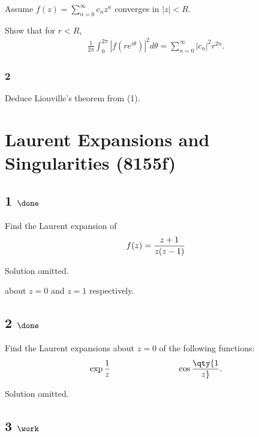 Assume \(\displaystyle f(z) = \sum_{n=0}^\infty c_n z^n\) converges in
\(|z| < R\).

Show that for \(r <R\),
\begin{align*}
\frac{1}{2 \pi} \int_0^{2 \pi} |f(r e^{i \theta})|^2 d \theta = \sum_{n=0}^\infty |c_n|^2 r^{2n}
.\end{align*}

\hypertarget{section-9}{%
\subsubsection{2}\label{section-9}}

Deduce Liouville's theorem from (1).

\hypertarget{laurent-expansions-and-singularities-8155f}{%
\section{Laurent Expansions and Singularities
(8155f)}\label{laurent-expansions-and-singularities-8155f}}

\hypertarget{done-6}{%
\subsection{\texorpdfstring{1
\(\done\)}{1 \textbackslash done}}\label{done-6}}

Find the Laurent expansion of
\begin{align*}
f(z) = {z + 1 \over z(z-1)}
\end{align*}

Solution omitted.

about \(z=0\) and \(z=1\) respectively.

\hypertarget{done-7}{%
\subsection{\texorpdfstring{2
\(\done\)}{2 \textbackslash done}}\label{done-7}}

Find the Laurent expansions about \(z=0\) of the following functions:
\begin{align*}
\exp{1\over z} \hspace{8em} \cos \qty{1\over z}
.\end{align*}

Solution omitted.

\hypertarget{work-42}{%
\subsection{\texorpdfstring{3
\(\work\)}{3 \textbackslash work}}\label{work-42}}


